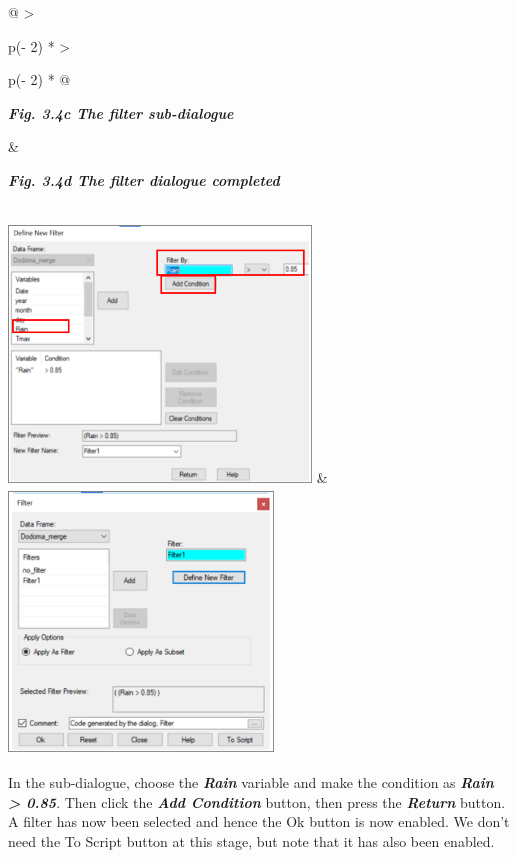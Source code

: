\documentclass[
  letterpaper,
  DIV=11,
  numbers=noendperiod]{scrreprt}
\begin{document}
\begin{longtable}[]{@{}
  >{\raggedright\arraybackslash}p{(\columnwidth - 2\tabcolsep) * }
  >{\raggedright\arraybackslash}p{(\columnwidth - 2\tabcolsep) * }@{}}
\toprule\noalign{}
\begin{minipage}[b]{\linewidth}\raggedright
\textbf{\emph{Fig. 3.4c The filter sub-dialogue}}
\end{minipage} & \begin{minipage}[b]{\linewidth}\raggedright
\textbf{\emph{Fig. 3.4d The filter dialogue completed}}
\end{minipage} \\
\midrule\noalign{}
\endhead
\bottomrule\noalign{}
\endlastfoot
\includegraphics[width=3.16753in,height=2.70312in]{figures/Fig3.4c.png}
&
\includegraphics[width=2.76678in,height=2.77561in]{figures/Fig3.4d.png} \\
\end{longtable}

In the sub-dialogue, choose the \textbf{\emph{Rain}} variable and make
the condition as \textbf{\emph{Rain \textgreater{} 0.85}}. Then click
the \textbf{\emph{Add Condition}} button, then press the
\textbf{\emph{Return}} button. A filter has now been selected and hence
the Ok button is now enabled. We don't need the To Script button at this
stage, but note that it has also been enabled.
\end{document}
